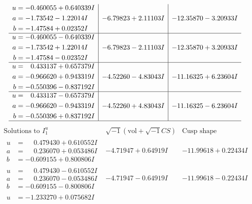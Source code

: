 \documentclass[1p]{elsarticle_modified}
\theoremstyle{definition}
\newcommand{\I}{\sqrt{-1}}
\begin{document}
$$\begin{array}{c|c|c}
\begin{aligned}
u &= -0.460055 + 0.640339 I \\
a &= -1.73542 - 1.22014 I \\
b &= -1.47584 + 0.02352 I\end{aligned}
 & -6.79823 + 2.11103 I & -12.35870 - 3.20933 I \\ \hline\begin{aligned}
u &= -0.460055 - 0.640339 I \\
a &= -1.73542 + 1.22014 I \\
b &= -1.47584 - 0.02352 I\end{aligned}
 & -6.79823 - 2.11103 I & -12.35870 + 3.20933 I \\ \hline\begin{aligned}
u &= \phantom{-}0.433137 + 0.657379 I \\
a &= -0.966620 + 0.943319 I \\
b &= -0.550396 - 0.837192 I\end{aligned}
 & -4.52260 - 4.83043 I & -11.16325 + 6.23604 I \\ \hline\begin{aligned}
u &= \phantom{-}0.433137 - 0.657379 I \\
a &= -0.966620 - 0.943319 I \\
b &= -0.550396 + 0.837192 I\end{aligned}
 & -4.52260 + 4.83043 I & -11.16325 - 6.23604 I\\
 \hline 
 \end{array}$$\newpage$$\begin{array}{c|c|c}  
\text{Solutions to }I^u_{1}& \I (\text{vol} + \sqrt{-1}CS) & \text{Cusp shape}\\
 \hline 
\begin{aligned}
u &= \phantom{-}0.479430 + 0.610552 I \\
a &= \phantom{-}0.236070 + 0.053486 I \\
b &= -0.609155 + 0.800806 I\end{aligned}
 & -4.71947 + 0.64919 I & -11.99618 + 0.22434 I \\ \hline\begin{aligned}
u &= \phantom{-}0.479430 - 0.610552 I \\
a &= \phantom{-}0.236070 - 0.053486 I \\
b &= -0.609155 - 0.800806 I\end{aligned}
 & -4.71947 - 0.64919 I & -11.99618 - 0.22434 I \\ \hline\begin{aligned}
u &= -1.233270 + 0.075682 I \\

\end{aligned}
\end{array}$$
\end{document}
